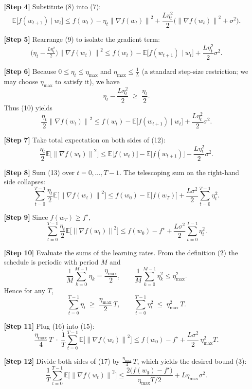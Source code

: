 \documentclass{article}
\newcommand{\E}{\mathbb{E}}
\newcommand{\norm}[1]{\left\lVert #1 \right\rVert}
\begin{document}
\noindent\textbf{[Step 4]} Substitute (8) into (7):
\[
\E\!\bigl[f(w_{t+1})\mid w_t\bigr]
\le f(w_t)-\eta_t\norm{\nabla f(w_t)}^{2}
+\frac{L\eta_t^{2}}{2}\bigl(\norm{\nabla f(w_t)}^{2}+\sigma^{2}\bigr).
\tag{9}
\]

\noindent\textbf{[Step 5]} Rearrange (9) to isolate the gradient term:
\[
\bigl(\eta_t-\tfrac{L\eta_t^{2}}{2}\bigr)\norm{\nabla f(w_t)}^{2}
\le f(w_t)-\E\!\bigl[f(w_{t+1})\mid w_t\bigr]
+\frac{L\eta_t^{2}}{2}\sigma^{2}.
\tag{10}
\]

\noindent\textbf{[Step 6]} Because $0\le\eta_t\le\eta_{\max}$ and
$\eta_{\max}\le\frac{1}{L}$ (a standard step‑size restriction; we may
choose $\eta_{\max}$ to satisfy it), we have
\[
\eta_t-\frac{L\eta_t^{2}}{2}\;\ge\;\frac{\eta_t}{2}.
\tag{11}
\]
Thus (10) yields
\[
\frac{\eta_t}{2}\norm{\nabla f(w_t)}^{2}
\le f(w_t)-\E\!\bigl[f(w_{t+1})\mid w_t\bigr]
+\frac{L\eta_t^{2}}{2}\sigma^{2}.
\tag{12}
\]

\noindent\textbf{[Step 7]} Take total expectation on both sides of (12):
\[
\frac{\eta_t}{2}\E\!\bigl[\norm{\nabla f(w_t)}^{2}\bigr]
\le \E\!\bigl[f(w_t)\bigr]-\E\!\bigl[f(w_{t+1})\bigr]
+\frac{L\eta_t^{2}}{2}\sigma^{2}.
\tag{13}
\]

\noindent\textbf{[Step 8]} Sum (13) over $t=0,\dots,T-1$.
The telescoping sum on the right‑hand side collapses:
\[
\sum_{t=0}^{T-1}\frac{\eta_t}{2}\E\!\bigl[\norm{\nabla f(w_t)}^{2}\bigr]
\le f(w_0)-\E\!\bigl[f(w_T)\bigr]
+\frac{L\sigma^{2}}{2}\sum_{t=0}^{T-1}\eta_t^{2}.
\tag{14}
\]

\noindent\textbf{[Step 9]} Since $f(w_T)\ge f^{\star}$,
\[
\sum_{t=0}^{T-1}\frac{\eta_t}{2}\E\!\bigl[\norm{\nabla f(w_t)}^{2}\bigr]
\le f(w_0)-f^{\star}
+\frac{L\sigma^{2}}{2}\sum_{t=0}^{T-1}\eta_t^{2}.
\tag{15}
\]

\noindent\textbf{[Step 10]} Evaluate the sums of the learning rates.
From the definition (2) the schedule is periodic with period $M$ and
\[
\frac{1}{M}\sum_{k=0}^{M-1}\eta_k
= \frac{\eta_{\max}}{2},
\qquad
\frac{1}{M}\sum_{k=0}^{M-1}\eta_k^{2}
\le \eta_{\max}^{2}.
\]
Hence for any $T$,
\[
\sum_{t=0}^{T-1}\eta_t \;\ge\; \frac{\eta_{\max}}{2}\,T,
\qquad
\sum_{t=0}^{T-1}\eta_t^{2}\;\le\; \eta_{\max}^{2}\,T.
\tag{16}
\]

\noindent\textbf{[Step 11]} Plug (16) into (15):
\[
\frac{\eta_{\max}}{4}\,T\;
\cdot\;
\frac{1}{T}\sum_{t=0}^{T-1}\E\!\bigl[\norm{\nabla f(w_t)}^{2}\bigr]
\le f(w_0)-f^{\star}
+\frac{L\sigma^{2}}{2}\,\eta_{\max}^{2}T.
\tag{17}
\]

\noindent\textbf{[Step 12]} Divide both sides of (17) by $\frac{\eta_{\max}}{4}\,T$,
which yields the desired bound (3):
\[
\frac{1}{T}\sum_{t=0}^{T-1}\E\!\bigl[\norm{\nabla f(w_t)}^{2}\bigr]
\le
\frac{2\bigl(f(w_0)-f^{\star}\bigr)}{\eta_{\max}T/2}
+L\eta_{\max}\sigma^{2}.
\tag{18}
\]
\end{document}
